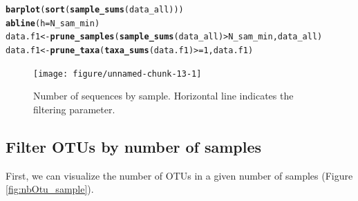 \documentclass[12pt]{article}\usepackage[]{graphicx}\usepackage[]{color}
\makeatletter
\newcommand{\hlnum}[1]{\textcolor[rgb]{0.686,0.059,0.569}{#1}}%
\newcommand{\hlopt}[1]{\textcolor[rgb]{0,0,0}{#1}}%
\newcommand{\hlstd}[1]{\textcolor[rgb]{0.345,0.345,0.345}{#1}}%
\newcommand{\hlkwb}[1]{\textcolor[rgb]{0.69,0.353,0.396}{#1}}%
\newcommand{\hlkwc}[1]{\textcolor[rgb]{0.333,0.667,0.333}{#1}}%
\newcommand{\hlkwd}[1]{\textcolor[rgb]{0.737,0.353,0.396}{\textbf{#1}}}%
\newenvironment{kframe}{%
 \def\at@end@of@kframe{}%
 \ifinner\ifhmode%
  \def\at@end@of@kframe{\end{minipage}}%
  \begin{minipage}{\columnwidth}%
 \fi\fi%
 \def\FrameCommand##1{\hskip\@totalleftmargin \hskip-\fboxsep
 \colorbox{shadecolor}{##1}\hskip-\fboxsep
     \hskip-\linewidth \hskip-\@totalleftmargin \hskip\columnwidth}%
 \MakeFramed {\advance\hsize-\width
   \@totalleftmargin\z@ \linewidth\hsize
   \@setminipage}}%
 {\par\unskip\endMakeFramed%
 \at@end@of@kframe}
\newenvironment{knitrout}{}{} %
\numberwithin{figure}{section}
\makeatother
\begin{document}
\begin{knitrout}\small
{}\color{fgcolor}\begin{kframe}
\begin{alltt}
\hlkwd{barplot}\hlstd{(}\hlkwd{sort}\hlstd{(}\hlkwd{sample_sums}\hlstd{(data_all)))}
\hlkwd{abline}\hlstd{(}\hlkwc{h} \hlstd{= N_sam_min)}
\hlstd{data.f1} \hlkwb{<-} \hlkwd{prune_samples}\hlstd{(}\hlkwd{sample_sums}\hlstd{(data_all)} \hlopt{>} \hlstd{N_sam_min, data_all)}
\hlstd{data.f1} \hlkwb{<-} \hlkwd{prune_taxa}\hlstd{(}\hlkwd{taxa_sums}\hlstd{(data.f1)} \hlopt{>=}  \hlnum{1}\hlstd{, data.f1)}
\end{alltt}
\end{kframe}\begin{figure}

{\centering \texttt{[image: figure/unnamed-chunk-13-1]} 

}

\caption[Number of sequences by sample]{Number of sequences by sample. Horizontal line indicates the filtering parameter.}\label{fig:unnamed-chunk-13}
\end{figure}


\end{knitrout}

  \subsection{Filter OTUs by number of samples}

First, we can visualize the number of OTUs in a given number of samples (Figure \ref{fig:nbOtu_sample}).
\end{document}
